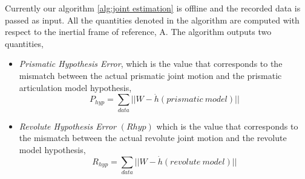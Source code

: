 \documentclass[12pt,a4paper]{report}
\begin{document}
Currently our algorithm \ref{alg:joint estimation} is offline and the recorded data is passed as input. All the quantities denoted in the algorithm are computed with respect to the inertial frame of reference, A. The algorithm outputs two quantities,
\begin{itemize}
  \item \textit{Prismatic Hypothesis Error}, which is the value that corresponds to the mismatch between the actual prismatic joint motion and the prismatic articulation model hypothesis,
  \begin{equation}
    P_{hyp}= \sum\limits_{data}||W-\dot{h}(prismatic ~model)||
    \label{phyp}
  \end{equation}
  
  \item \textit{Revolute Hypothesis Error} $(Rhyp)$ which is the value that corresponds to the mismatch between the actual revolute joint motion and the revolute model hypothesis,
  \begin{equation}
    R_{hyp}= \sum\limits_{data}||W-\dot{h}(revolute ~model)||
    \label{rhyp}
  \end{equation}
\end{itemize}
\end{document}
